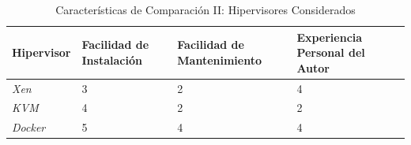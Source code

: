\begin{table}
	\centering
	\begin{tabular}{|p{1.85cm}|p{2.2cm}|p{3.0cm}|p{1.9cm}|}
    	\hline
		\textbf{Hipervisor} & \textbf{Facilidad de Instalación} & \textbf{Facilidad de Mantenimiento} & \textbf{Experiencia Personal del Autor} \\
        \hline
        \textit{Xen} & 3 & 2 & 4 \\
        \hline
        \textit{KVM} & 4 & 2 & 2 \\
        \hline
        \textit{Docker} & 5 & 4 & 4 \\
        \hline
	\end{tabular}
    \caption{Características de Comparación II: Hipervisores Considerados}
    \label{tab:hipervisor-compar-ii}
\end{table}

